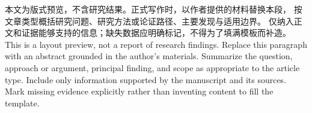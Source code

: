 \ifLWChinese
本文为版式预览，不含研究结果。正式写作时，以作者提供的材料替换本段，
按文章类型概括研究问题、研究方法或论证路径、主要发现与适用边界。
仅纳入正文和证据能够支持的信息；缺失数据应明确标记，不得为了填满模板而补造。
\else
This is a layout preview, not a report of research findings. Replace this
paragraph with an abstract grounded in the author's materials. Summarize the
question, approach or argument, principal finding, and scope as appropriate to
the article type. Include only information supported by the manuscript and its
sources. Mark missing evidence explicitly rather than inventing content to
fill the template.
\fi
